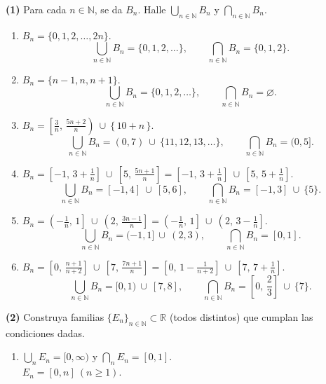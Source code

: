\documentclass[12pt,letterpaper]{exam}
\begin{document}
\begin{questions}

\question \textbf{(1)} Para cada $n\in\mathbb N$, se da $B_n$. Halle $\displaystyle\bigcup_{n\in\mathbb N}B_n$ y $\displaystyle\bigcap_{n\in\mathbb N}B_n$.
\begin{enumerate}[label=\alph*)]
\item $B_n=\{0,1,2,\ldots,2n\}.$
\[
\bigcup_{n\in\mathbb N}B_n=\{0,1,2,\ldots\},\qquad
\bigcap_{n\in\mathbb N}B_n=\{0,1,2\}.
\]

\item $B_n=\{n-1,n,n+1\}.$
\[
\bigcup_{n\in\mathbb N}B_n=\{0,1,2,\ldots\},\qquad
\bigcap_{n\in\mathbb N}B_n=\varnothing.
\]

\item $B_n=\left[\frac{3}{n},\,\frac{5n+2}{n}\right)\ \cup\ \{\,10+n\,\}.$
\[
\bigcup_{n\in\mathbb N}B_n=(0,7)\ \cup\ \{11,12,13,\ldots\},\qquad
\bigcap_{n\in\mathbb N}B_n=(0,5].
\]

\item $B_n=\left[-1,\,3+\frac{1}{n}\right]\ \cup\ \left[5,\,\frac{5n+1}{n}\right]
=\left[-1,\,3+\frac{1}{n}\right]\ \cup\ \left[5,\,5+\frac{1}{n}\right].$
\[
\bigcup_{n\in\mathbb N}B_n=[-1,4]\ \cup\ [5,6],\qquad
\bigcap_{n\in\mathbb N}B_n=[-1,3]\ \cup\ \{5\}.
\]

\item $B_n=\left(-\frac{1}{n},\,1\right]\ \cup\ \left(2,\,\frac{3n-1}{n}\right]
=\left(-\frac{1}{n},\,1\right]\ \cup\ \left(2,\,3-\frac{1}{n}\right].$
\[
\bigcup_{n\in\mathbb N}B_n=(-1,1]\ \cup\ (2,3),\qquad
\bigcap_{n\in\mathbb N}B_n=[0,1].
\]

\item $B_n=\left[0,\,\frac{n+1}{n+2}\right]\ \cup\ \left[7,\,\frac{7n+1}{n}\right]
=\left[0,\,1-\frac{1}{n+2}\right]\ \cup\ \left[7,\,7+\frac{1}{n}\right].$
\[
\bigcup_{n\in\mathbb N}B_n=[0,1)\ \cup\ [7,8],\qquad
\bigcap_{n\in\mathbb N}B_n=\left[0,\,\frac{2}{3}\right]\ \cup\ \{7\}.
\]
\end{enumerate}

\question \textbf{(2)} Construya familias $\{E_n\}_{n\in\mathbb N}\subset\mathbb R$ (todos distintos) que cumplan las condiciones dadas.
\begin{enumerate}[label=\alph*)]
\item $\displaystyle\bigcup_{n}E_n=[0,\infty)$ y $\displaystyle\bigcap_{n}E_n=[0,1]$.\\
$E_n=[0,n]\ (n\ge1)$.


\end{enumerate}
\end{questions}
\end{document}
